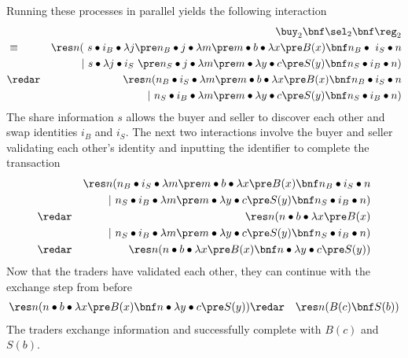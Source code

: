 \documentclass{LMCS}
\renewcommand{\rew}{\redar}
\begin{document}
Running these processes in parallel yields the following interaction
\begin{eqnarray*}
& & \buy_2 \bnf \sel_2 \bnf \reg_2\\
 &\equiv&	\res n (\ s\bullet i_B\bullet\lambda j \pre n_B\bullet j\bullet\lambda m \pre 
									m\bullet b\bullet \lambda x \pre B(x)
						\bnf  n_B\bullet\  {i_S}\bullet n\\
 && 	\qquad |\ 	s\bullet \lambda j\bullet i_S\ \pre n_S\bullet j\bullet\lambda m \pre
           				m\bullet \lambda y\bullet c\pre S(y)
 						\bnf  n_S\bullet  {i_B}\bullet n)\\
 &\rew&	  \res n (n_B\bullet i_S\bullet\lambda m \pre 
									m\bullet b\bullet \lambda x \pre B(x)
						\bnf  n_B\bullet  {i_S}\bullet n\\
 && 	\qquad |\   n_S\bullet i_B\bullet\lambda m \pre
           				m\bullet \lambda y\bullet c\pre S(y)
 						\bnf  n_S\bullet  {i_B}\bullet n) 
\end{eqnarray*}
The share information $s$ allows the buyer and seller to discover
each other and swap identities $i_B$ and $i_S$. The next two
interactions involve the buyer and seller validating each other's
identity and inputting the identifier to complete the transaction
\begin{eqnarray*}
 &&	  \res n (n_B\bullet i_S\bullet\lambda m \pre 
									m\bullet b\bullet \lambda x \pre B(x)
						\bnf  n_B\bullet  {i_S}\bullet n\\
 && 	\qquad |\   n_S\bullet i_B\bullet\lambda m \pre
           				m\bullet \lambda y\bullet c\pre S(y)
 						\bnf  n_S\bullet  {i_B}\bullet n)\\
&\rew&\res n (n\bullet b\bullet \lambda x \pre B(x)\\
 && 	\qquad |\   n_S\bullet i_B\bullet\lambda m \pre
           				m\bullet \lambda y\bullet c\pre S(y)
 						\bnf  n_S\bullet  {i_B}\bullet n)\\
&\rew&\res n (n\bullet b\bullet \lambda x \pre B(x)\bnf 
           				n\bullet \lambda y\bullet c\pre S(y))
\end{eqnarray*}
Now that the traders have validated each other, they can continue
with the exchange step from before
\begin{eqnarray*}
\res n (n\bullet b\bullet \lambda x \pre B(x)\bnf n\bullet \lambda y\bullet c\pre S(y))
& \rew & \res n (B(c)\bnf S(b))
\end{eqnarray*}
The traders exchange information and successfully complete with 
$B(c)$ and $S(b)$.
\end{document}
